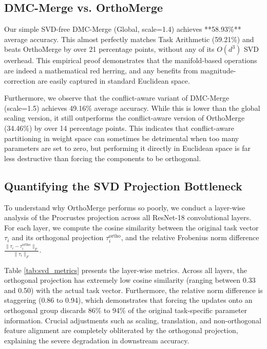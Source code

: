 \documentclass{article}
\begin{document}
\subsection{DMC-Merge vs. OrthoMerge}
Our simple SVD-free DMC-Merge (Global, scale=1.4) achieves **58.93\%** average accuracy. This almost perfectly matches Task Arithmetic (59.21\%) and beats OrthoMerge by over 21 percentage points, without any of its $O(d^3)$ SVD overhead. This empirical proof demonstrates that the manifold-based operations are indeed a mathematical red herring, and any benefits from magnitude-correction are easily captured in standard Euclidean space.

Furthermore, we observe that the conflict-aware variant of DMC-Merge (scale=1.5) achieves 49.16\% average accuracy. While this is lower than the global scaling version, it still outperforms the conflict-aware version of OrthoMerge (34.46\%) by over 14 percentage points. This indicates that conflict-aware partitioning in weight space can sometimes be detrimental when too many parameters are set to zero, but performing it directly in Euclidean space is far less destructive than forcing the components to be orthogonal.

\subsection{Quantifying the SVD Projection Bottleneck}
To understand why OrthoMerge performs so poorly, we conduct a layer-wise analysis of the Procrustes projection across all ResNet-18 convolutional layers. For each layer, we compute the cosine similarity between the original task vector $\tau_i$ and its orthogonal projection $\tau_i^{\text{ortho}}$, and the relative Frobenius norm difference $\frac{\|\tau_i - \tau_i^{\text{ortho}}\|_F}{\|\tau_i\|_F}$.

Table \ref{tab:svd_metrics} presents the layer-wise metrics. Across all layers, the orthogonal projection has extremely low cosine similarity (ranging between 0.33 and 0.50) with the actual task vector. Furthermore, the relative norm difference is staggering (0.86 to 0.94), which demonstrates that forcing the updates onto an orthogonal group discards 86\% to 94\% of the original task-specific parameter information. Crucial adjustments such as scaling, translation, and non-orthogonal feature alignment are completely obliterated by the orthogonal projection, explaining the severe degradation in downstream accuracy.
\end{document}
